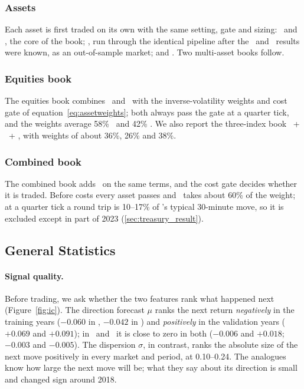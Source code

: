 \subsubsection{Assets}

Each asset is first traded on its own with the same setting, gate and sizing: \ES\ and \NQ, the
core of the book; \YM, run through the identical pipeline after the \ES\ and \NQ\ results were
known, as an out-of-sample market; and \ZN. Two multi-asset books follow.

\subsubsection{Equities book}

The equities book combines \ES\ and \NQ\ with the inverse-volatility weights and cost gate of
equation~\eqref{eq:assetweights}; both always pass the gate at a quarter tick, and the weights
average 58\% \ES\ and 42\% \NQ. We also report the three-index book \ES\ + \NQ\ + \YM, with
weights of about 36\%, 26\% and 38\%.

\subsubsection{Combined book}

The combined book adds \ZN\ on the same terms, and the cost gate decides whether it is traded.
Before costs every asset passes and \ZN\ takes about 60\% of the weight; at a quarter tick a round
trip is 10--17\% of \ZN's typical 30-minute move, so it is excluded except in part of 2023
(\ref{sec:treasury_result}).

\subsection{General Statistics}\label{sec:signalquality}

\paragraph{Signal quality.} Before trading, we ask whether the two features rank what happened
next (Figure~\ref{fig:ic}). The direction forecast $\mu$ ranks the next return
\emph{negatively} in the training years ($-0.060$ in \ES, $-0.042$ in \NQ) and \emph{positively}
in the validation years ($+0.069$ and $+0.091$); in \YM\ and \ZN\ it is close to zero in both
($-0.006$ and $+0.018$; $-0.003$ and $-0.005$). The dispersion $\sigma$, in contrast, ranks the
absolute size of the next move positively in every market and period, at 0.10--0.24. The
analogues know how large the next move will be; what they say about its direction is small and
changed sign around 2018.

